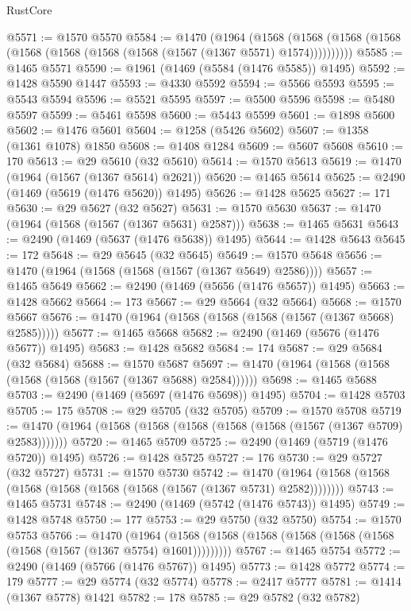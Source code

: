 \begin{lexlean}{RustCore}
\begin{coremodule}
@5571 := @1570 @5570
@5584 := @1470
    (@1964
      (@1568 (@1568 (@1568 (@1568 (@1568 (@1568 (@1568 (@1568 (@1567 (@1367 @5571) @1574))))))))))
@5585 := @1465 @5571
@5590 := @1961 (@1469 (@5584 (@1476 @5585)) @1495)
@5592 := @1428 @5590 @1447
@5593 := @4330 @5592
@5594 := @5566 @5593
@5595 := @5543 @5594
@5596 := @5521 @5595
@5597 := @5500 @5596
@5598 := @5480 @5597
@5599 := @5461 @5598
@5600 := @5443 @5599
@5601 := @1898 @5600
@5602 := @1476 @5601
@5604 := @1258 (@5426 @5602)
@5607 := @1358 (@1361 @1078) @1850
@5608 := @1408 @1284
@5609 := @5607 @5608
@5610 := 170
@5613 := @29 @5610 (@32 @5610)
@5614 := @1570 @5613
@5619 := @1470 (@1964 (@1567 (@1367 @5614) @2621))
@5620 := @1465 @5614
@5625 := @2490 (@1469 (@5619 (@1476 @5620)) @1495)
@5626 := @1428 @5625
@5627 := 171
@5630 := @29 @5627 (@32 @5627)
@5631 := @1570 @5630
@5637 := @1470 (@1964 (@1568 (@1567 (@1367 @5631) @2587)))
@5638 := @1465 @5631
@5643 := @2490 (@1469 (@5637 (@1476 @5638)) @1495)
@5644 := @1428 @5643
@5645 := 172
@5648 := @29 @5645 (@32 @5645)
@5649 := @1570 @5648
@5656 := @1470 (@1964 (@1568 (@1568 (@1567 (@1367 @5649) @2586))))
@5657 := @1465 @5649
@5662 := @2490 (@1469 (@5656 (@1476 @5657)) @1495)
@5663 := @1428 @5662
@5664 := 173
@5667 := @29 @5664 (@32 @5664)
@5668 := @1570 @5667
@5676 := @1470 (@1964 (@1568 (@1568 (@1568 (@1567 (@1367 @5668) @2585)))))
@5677 := @1465 @5668
@5682 := @2490 (@1469 (@5676 (@1476 @5677)) @1495)
@5683 := @1428 @5682
@5684 := 174
@5687 := @29 @5684 (@32 @5684)
@5688 := @1570 @5687
@5697 := @1470 (@1964 (@1568 (@1568 (@1568 (@1568 (@1567 (@1367 @5688) @2584))))))
@5698 := @1465 @5688
@5703 := @2490 (@1469 (@5697 (@1476 @5698)) @1495)
@5704 := @1428 @5703
@5705 := 175
@5708 := @29 @5705 (@32 @5705)
@5709 := @1570 @5708
@5719 := @1470 (@1964 (@1568 (@1568 (@1568 (@1568 (@1568 (@1567 (@1367 @5709) @2583)))))))
@5720 := @1465 @5709
@5725 := @2490 (@1469 (@5719 (@1476 @5720)) @1495)
@5726 := @1428 @5725
@5727 := 176
@5730 := @29 @5727 (@32 @5727)
@5731 := @1570 @5730
@5742 := @1470 (@1964 (@1568 (@1568 (@1568 (@1568 (@1568 (@1568 (@1567 (@1367 @5731) @2582))))))))
@5743 := @1465 @5731
@5748 := @2490 (@1469 (@5742 (@1476 @5743)) @1495)
@5749 := @1428 @5748
@5750 := 177
@5753 := @29 @5750 (@32 @5750)
@5754 := @1570 @5753
@5766 := @1470
    (@1964 (@1568 (@1568 (@1568 (@1568 (@1568 (@1568 (@1568 (@1567 (@1367 @5754) @1601)))))))))
@5767 := @1465 @5754
@5772 := @2490 (@1469 (@5766 (@1476 @5767)) @1495)
@5773 := @1428 @5772
@5774 := 179
@5777 := @29 @5774 (@32 @5774)
@5778 := @2417 @5777
@5781 := @1414 (@1367 @5778) @1421
@5782 := 178
@5785 := @29 @5782 (@32 @5782)

\end{coremodule}
\end{lexlean}
